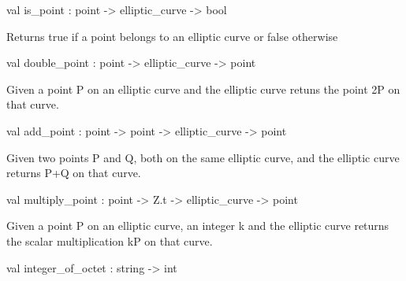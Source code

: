 \documentclass[11pt]{article}
\begin{document}
\begin{ocamldocsigend}
\begin{ocamldocdescription}
\end{ocamldocdescription}


\label{val:Ecc.Ecc.is-underscorepoint}\begin{ocamldoccode}
val is_point : point -> elliptic_curve -> bool
\end{ocamldoccode}
\begin{ocamldocdescription}
Returns true if a point belongs to an elliptic curve or false otherwise


\end{ocamldocdescription}


\label{val:Ecc.Ecc.double-underscorepoint}\begin{ocamldoccode}
val double_point : point -> elliptic_curve -> point
\end{ocamldoccode}
\begin{ocamldocdescription}
Given a point P on an elliptic curve and the elliptic curve retuns the point 2P 
        on that curve.


\end{ocamldocdescription}


\label{val:Ecc.Ecc.add-underscorepoint}\begin{ocamldoccode}
val add_point : point -> point -> elliptic_curve -> point
\end{ocamldoccode}
\begin{ocamldocdescription}
Given two points P and Q, both on the same elliptic curve, and the elliptic curve returns 
        P+Q on that curve.


\end{ocamldocdescription}


\label{val:Ecc.Ecc.multiply-underscorepoint}\begin{ocamldoccode}
val multiply_point : point -> Z.t -> elliptic_curve -> point
\end{ocamldoccode}
\begin{ocamldocdescription}
Given a point P on an elliptic curve, an integer k and the elliptic curve returns 
        the scalar multiplication kP on that curve.


\end{ocamldocdescription}


\label{val:Ecc.Ecc.integer-underscoreof-underscoreoctet}\begin{ocamldoccode}
val integer_of_octet : string -> int
\end{ocamldoccode}



\end{ocamldocsigend}
\end{document}
